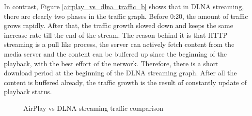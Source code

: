 In contrast, Figure \ref{airplay_vs_dlna_traffic_b} shows that in DLNA streaming, there are clearly two phases in the traffic graph. Before 0:20, the amount of traffic grows rapidly. After that, the traffic growth slowed down and keeps the same increase rate till the end of the stream. The reason behind it is that HTTP streaming is a pull like process, the server can actively fetch content from the media server and the content can be buffered up since the beginning of the playback, with the best effort of the network. Therefore, there is a short download period at the beginning of the DLNA streaming graph. After all the content is buffered already, the traffic growth is the result of constantly update of playback status.
\begin{figure}[hb]
\caption{AirPlay vs DLNA streaming traffic
comparison \label{airplay_vs_dlna_traffic}}
\end{figure}
\clearpage

